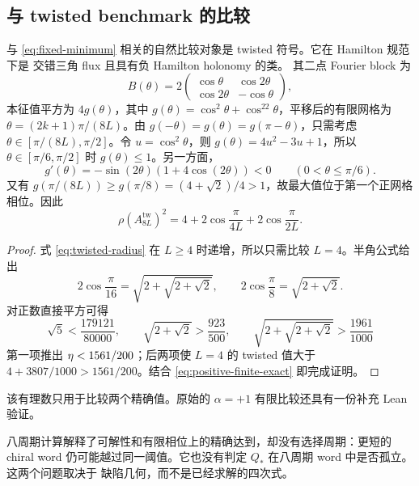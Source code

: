 \subsection{与 twisted benchmark 的比较}
\label{sec:twisted}

与 \eqref{eq:fixed-minimum} 相关的自然比较对象是 twisted 符号。它在 Hamilton 规范下是
交错三角 flux 且具有负 Hamilton holonomy 的类。
其二点 Fourier block 为
\begin{equation}
 B(\theta)=2\begin{pmatrix}\cos\theta&\cos2\theta\\\cos2\theta&-\cos\theta\end{pmatrix},
 \label{eq:twisted-block}
\end{equation}
本征值平方为 $4g(\theta)$，其中
$g(\theta)=\cos^2\theta+\cos^22\theta$，平移后的有限网格为
$\theta=(2k+1)\pi/(8L)$。由
$g(-\theta)=g(\theta)=g(\pi-\theta)$，只需考虑
$\theta\in[\pi/(8L),\pi/2]$。令 $u=\cos^2\theta$，则
$g(\theta)=4u^2-3u+1$，所以 $\theta\in[\pi/6,\pi/2]$ 时
$g(\theta)\leq1$。另一方面，
\[
 g'(\theta)=-\sin(2\theta)(1+4\cos(2\theta))<0
 \qquad(0<\theta\leq\pi/6).
\]
又有 $g(\pi/(8L))\geq g(\pi/8)=(4+\sqrt2)/4>1$，故最大值位于第一个正网格相位。因此
\begin{equation}
 \rho(A_{8L}^{\mathrm{tw}})^2
 =4+2\cos\frac{\pi}{4L}+2\cos\frac{\pi}{2L}.
 \label{eq:twisted-radius}
\end{equation}

\begin{proof}
式 \eqref{eq:twisted-radius} 在 $L\geq4$ 时递增，所以只需比较 $L=4$。半角公式给出
\begin{equation}
 2\cos\frac{\pi}{16}=\sqrt{2+\sqrt{2+\sqrt2}},\qquad
 2\cos\frac{\pi}{8}=\sqrt{2+\sqrt2}.
 \label{eq:rational-separator}
\end{equation}
对正数直接平方可得
\[
\sqrt5<\frac{179121}{80000},\qquad
\sqrt{2+\sqrt2}>\frac{923}{500},\qquad
\sqrt{2+\sqrt{2+\sqrt2}}>\frac{1961}{1000}
\]
第一项推出 $\eta<1561/200$；后两项使 $L=4$ 的 twisted 值大于
$4+3807/1000>1561/200$。结合 \eqref{eq:positive-finite-exact} 即完成证明。
\end{proof}

该有理数只用于比较两个精确值。原始的 $\alpha=+1$ 有限比较还具有一份补充 Lean 验证。

八周期计算解释了可解性和有限相位上的精确达到，却没有选择周期：更短的 chiral word
仍可能越过同一阈值。它也没有判定 $Q_*$ 在八周期 word 中是否孤立。这两个问题取决于
缺陷几何，而不是已经求解的四次式。
